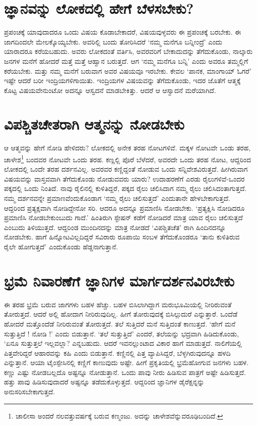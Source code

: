 \section*{ಜ್ಞಾನವನ್ನು ಲೋಕದಲ್ಲಿ ಹೇಗೆ ಬೆಳಸಬೇಕು?}

ಪ್ರಪಂಚಕ್ಕೆ ಯಾವುದಾದರೂ ಒಂದು ವಿಷಯ ಕೊಡಾಬೇಕಾದರೆ, ವಿಷಯವುಳ್ಳವರು ಈ ಪ್ರಪಂಚಕ್ಕೆ ಬರಬೇಕು. ಈ ಜಾಗದಿಂದಲೇ ಮೇಲಕ್ಕೊಯ್ಯಬೇಕು. ಅವರಿಲ್ಲಿ ಬಂದು ತೋರಿಸಿದರೆ `ನಮ್ಮ ಮನೆಗೂ ಬನ್ನೀಂದ್ರೆ' ಎಂದು ಯಾರಾದರೂ ಕರೆಯಬಹುದು. ಅವರು ಲೋಕದಂತೆ ವರ್ತಿಸಿ, ಅವರವರಿಗೆ ಬೇಕಾದುದನ್ನು ತೆಗೆದುಕೊಂಡು, ನಾಲ್ಕಾರು ಜನಗಳ ಮನೆಗೆ ಹೋದರೆ ಮತ್ತೆ ಮತ್ತೆ ಆಹ್ವಾನ ಬರುತ್ತದೆ. ಆಗ `ನಮ್ಮ ಮನೆಗೂ ಬನ್ನಿ' ಎಂದು ಅವರೂ ತಮ್ಮಲ್ಲಿಗೆ ಕರೆಯಬೇಕು. ಮತ್ತು ನಮ್ಮ ಮನೆಗೆ ಬರುವಾಗ ಅವರ ವಿಷಯವೂ ಇರಬೇಕು. ಕೇವಲ `ಪಾನಕ, ಮಾಂಗಾಯ್ ಓಗರೆ' ಇಷ್ಟೇ ಆದರೆ ಬರೀ ಇಂದ್ರಿಯಗಳಿಗಾಯಿತು. ಇಂದ್ರಿಯಗಳ ವಿಷಯವನ್ನು ತೆಗೆದುಕೊಂಡು, ಇದರ ಜೊತೆಗೆ ಆತ್ಮಕ್ಕೆ ಕೊಟ್ಟ ವಿಷಯವೇನುಂಟೋ ಅದನ್ನೂ ಆಸ್ವದನೆ ಮಾಡಬೇಕಿತ್ತು. ಆದರೆ ಆ ಆಸ್ವಾದನೆ ಮರೆಯಾಗಿದೆ.

\section*{ವಿಪಶ್ಚಿತಚೇತರಾಗಿ ಆತ್ಮನನ್ನು ನೋಡಬೇಕು}

ಆ ಆತ್ಮವನ್ನು ಹೇಗೆ ನೋಡಿ ಹೇಳಿದರು? ಲೋಕದಲ್ಲಿ ಅನೇಕ ತರಹ ನೋಟಗಳಿವೆ. ಮಕ್ಕಳ ನೋಟವೇ ಒಂಡು ತರಹ, ಚಾಳೇಶ\footnote{ಚಾಲೀಸಾ ಅಂದರೆ ನಲವತ್ತುವರ್ಷಕ್ಕೆ ಬರುವ ಕಣ್ಮಂಜು. ಅದನ್ನು ಚಾಳೇಶವೆನ್ನುವರೂಢಿಬಂದಿದೆ.} ಬಂದವರ ನೋಟವೇ ಒಂದು ತರಹ. ಕಣ್ಣಲ್ಲಿ ಪೊರೆ ಬೆಳೆದರೆ, ಅವರದೇ ಒಂದು ತರಹ ನೋಟ, ಆದ್ದರಿಂದ ಲೋಕದಲ್ಲಿ ಒಂದೇ ತರಹ ದರ್ಶನವಿಲ್ಲ. ಅವರವರ ಕಣ್ಣಿದ್ದಂತೆ ನೋಡುವ ಒಂದು ಸನ್ನಿವೇಶವಿರುತ್ತದೆ. ಹೀಗಿರುವಾಗ ವಿಷಯವನ್ನು ವಾಸ್ತವವಾಗಿ ತೆಗೆದುಕೊಂಡು ನೋಡುವವರು ಯಾರು? ಉದಾಹರಣೆಗೆ ಎರಡು ರೈಲುಗಳಿವೆ-ಒಂದರ ಪಕ್ಕದಲ್ಲಿ ಒಂದು ನಿಂತಿದೆ. ನಾವು ರೈಲಿನಲ್ಲಿ ಕುಳಿತಿದ್ದರೆ, ಪಕ್ಕದ ರೈಲು ಚಲಿಸಿದಾಗ ನಮ್ಮ ರೈಲು ಚಲಿಸಿದಂತಾಗುತ್ತದೆ. ನಮ್ಮ ದರ್ಶನವನ್ನೇ ಪ್ರಮಾಣವೆಂದುಕೊಂಡಾಗ `ನಮ್ಮ ರೈಲು ಚಲಿಸುತ್ತದೆ' ಎಂದುತಾನೇ ಹೇಳಬೇಕಾಗುತ್ತದೆ. ಆದ್ದರಿಂದ ಪ್ರತ್ಯಕ್ಷವಾಗಿ ನೋಡಿದ್ದೇನೋ ಸರಿ. ಆದರೂ ಅದನ್ನೂ ಪ್ರಮಾಣಿಸಿ ನೋಡಬೇಕು. `ಪ್ರತ್ಯಕ್ಷಿಸಿ ನೋಡಿದರೂ ಪ್ರಮಾಣಿಸಿ ನೋಡಬೇಕುಂಬುದು ಗಾದೆ.' ಹಿಂತಿರುಗಿ ಸ್ಟೇಷನ್ ಕಡೆಗೆ ನೋಡಿದರೆ ಮಾತ್ರ ಯಾವ ರೈಲು ಚಲಿಸುತ್ತದೆ ಎಂಬುದು ತಿಳಿಯುತ್ತದೆ. ಆದ್ದರಿಂಡ ಮುಂದಿನದನ್ನು ಮಾತ್ರ ನೋಡದೆ `ವಿಪಶ್ಚಿತಚೆತ' ರಾಗಿ ಹಿಂದಿನದನ್ನೂ ನೋಡಬೇಕು. ಹಾಗೆ ಹಿನ್ನೋಟವಿಲ್ಲದಿದ್ದರೆ ಸವಿರಾರು ರೂಪಾಯಿ ಸಂಬಳ ತೆಗೆದುಕೊಂಡರೂ `ತಾನು ಕುಳಿತಿರುವ ರೈಲೇ ಹೋಗುತ್ತದೆ' ಎಂದುಕೊಂಡು ಹೆಡ್ಡನಾಗುತ್ತಾನೆ.

\section*{ಭ್ರಮೆ ನಿವಾರಣೆಗೆ ಜ್ಞಾನಿಗಳ ಮಾರ್ಗದರ್ಶನವಿರಬೇಕು}

ಈ ತರಹ ಭ್ರಮೆ ಬರುವ ಜಾಗಗಳು ಬಹಳ ಹೆಚ್ಚು. ಬಹಳ ಬಿಸಿಲಾಗಿದ್ದಾಗ ಮರುಭೂಮಿಯಲ್ಲಿ ನೀರಿರುವಂತೆ ತೋರುತ್ತದೆ. ಆದರೆ ಅಲ್ಲಿ ಹೋದಾಗ ನೀರಿರುವುದಿಲ್ಲ. ಹೀಗೆ ತೋರುವುದಕ್ಕೆ ಬಿಸಿಲ್ಗುದುರೆ ಎನ್ನುತ್ತಾರೆ. ಒಂದೆಡೆ ಹೋದರೆ ಮತ್ತೊಂದೆಡೆ ನೀರಿರುವಂತೆ ತೋರುತ್ತದೆ. ತಲೆ ಸುತ್ತಿದರೆ ಮನೆ ಸುತ್ತಿದಂತೆ ಕಾಣುತ್ತದೆ. `ಹೇಗೆ ಮನೆ ಸುತ್ತುತ್ತಿದೆ ! ನೋಡಿ !' ಎಂದು ಬಿಡುತ್ತಾನೆ. `ತಲೆ ಸುತ್ತುತ್ತಿದೆ' ಎಂದರೆ, ತಲೆಯನ್ನು ಭದ್ರವಾಗಿ ಹಿಡಿದುಕೊಂಡು, `ಏನೂ ಸುತ್ತುತ್ತಲೆ ಇಲ್ಲವಲ್ಲಾ? ಎನ್ನಬಹುದು. ಆದರೆ ಇವನಲ್ಲುಂಟಾದ ವಿಕಾರ ಹಾಗೆ ಮಾಡುತ್ತದೆ. ನಾಲಿಗೆಯಲ್ಲಿ ಪಿತ್ತವೇರಿದ್ದರೆ ಆಹಾರವನ್ನು ಕಹಿ ಎಂದು ಬಿಡುತ್ತಾನೆ. ಕಣ್ಣಿನಲ್ಲಿ ಪಿತ್ತ ವ್ಯಾಪಿಸಿದ್ದರೆ, ಬೆಳ್ಳಗಿರುವುದನ್ನೂ ಹಳದಿ ಎನ್ನುತ್ತಾನೆ. ಆಯಾ ಟೈಂಸ್ಪೇಸಿನಲ್ಲಿ ಕಣ್ಣಿಗೆ ಕಾಣುವುದು ಅಷ್ಟೇ. ಹೀಗೆ ಪ್ರಕೃತಿಯಲ್ಲಿ  ಭ್ರಮೆಹೋಗುವ ಜನಗಳು ಬಹಳ. ಕಣ್ಣು  ಎಷ್ಟು ನೋಡಬಲ್ಲದೊ ಅಷ್ಟನ್ನೂ ನೋಡುತ್ತಾನೆ. ಒಂದು ಪಾವು ನೀರು ಹಿಡಿಸುವ ಪಾತ್ರಗೆ ಅಷ್ಟೇ ಹಿಡಿಸುತ್ತದೆ. ಹತ್ತು ಪಾವು ಹಿಡಿಸುವುದಾದರೆ ಅಷ್ಟನ್ನೂ ತಡೆದುಕೊಳ್ಳುತ್ತದೆ. ಆದ್ದರಿಂದ ಜ್ಞಾನಿಗಳ ಡೈರೆಕ್ಷನ್ನನ್ನು ಅನುಸರಿಸಬೇಕಾಗುತ್ತದೆ.

